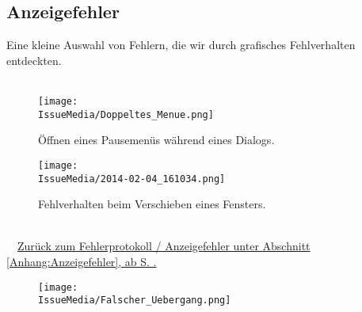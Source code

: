 %



\clearpage


	
	
\subsection*{Anzeigefehler}

Eine kleine Auswahl von Fehlern, die wir durch grafisches Fehlverhalten entdeckten.\\~\\


%
%	
%	
%


\begin{figure}[ht]

	\centering
	\label{Anhang:Grafikfehler:Dialog_Pause}
	
	\texttt{[image: \\IssueMedia/Doppeltes\_Menue.png]}
	
	\caption{Öffnen eines Pausemenüs während eines Dialogs.}

\end{figure}

\begin{figure}[ht]

	\centering
	\label{Anhang:Grafikfehler:Fenster_Schieben}
	
	\texttt{[image: \\IssueMedia/2014-02-04\_161034.png]}
	
	\caption{Fehlverhalten beim Verschieben eines Fensters.}

\end{figure}



~\\~\mousecursor~\hyperref[Anhang:Anzeigefehler]{Zurück zum Fehlerprotokoll / Anzeigefehler unter Abschnitt \ref{Anhang:Anzeigefehler}, ab S. \pageref{Anhang:Anzeigefehler}.}


\clearpage



\begin{figure}[ht!]

	\centering
	\label{Anhang:Grafikfehler:Verschmolzene_Geometrie}
	
	\texttt{[image: \\IssueMedia/Falscher\_Uebergang.png]}

\end{figure}


